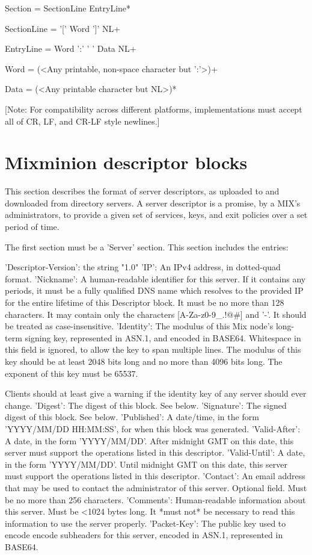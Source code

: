Section = SectionLine EntryLine*

SectionLine = '[' Word ']' NL+

EntryLine = Word ':' ' ' Data NL+

Word = (<Any printable, non-space character but ':'>)+

Data = (<Any printable character but NL>)*

[Note: For compatibility across different platforms, implementations must
  accept all of CR, LF, and CR-LF style newlines.]

\section{Mixminion descriptor blocks}

This section describes the format of server descriptors, as uploaded
to and downloaded from directory servers.  A server descriptor is a
promise, by a MIX's administrators, to provide a given set of
services, keys, and exit policies over a set period of time.

The first section must be a 'Server' section.  This section includes
the entries:

     'Descriptor-Version':  the string "1.0"
     'IP': An IPv4 address, in dotted-quad format.
     'Nickname': A human-readable identifier for this server.  If it
         contains any periods, it must be a fully qualified DNS name
         which resolves to the provided IP for the entire lifetime of
         this Descriptor block.  It must be no more than 128
         characters.  It may contain only the characters 
         [A-Za-z0-9_.!@#] and '-'.  It should be treated as
         case-insensitive.
     'Identity': The modulus of this Mix node's long-term signing key,
         represented in ASN.1, and encoded in BASE64.  Whitespace in
         this field is ignored, to allow the key to span multiple
         lines.  The modulus of this key should be at least 2048 bits
         long and no more than 4096 bits long.  The exponent of this 
         key must be 65537.

	 Clients should at least give a warning if the identity key of
         any server should ever change.
     'Digest': The digest of this block. See below.
     'Signature': The signed digest of this block.  See below.
     'Published': A date/time, in the form 'YYYY/MM/DD HH:MM:SS',
         for when this block was generated.
     'Valid-After': A date, in the form 'YYYY/MM/DD'.  After midnight GMT
         on this date, this server must support the operations listed
         in this descriptor.
     'Valid-Until': A date, in the form 'YYYY/MM/DD'.  Until midnight
         GMT on this date, this server must support the operations listed
         in this descriptor.
     'Contact': An email address that may be used to contact the
         administrator of this server. Optional field.  Must be no
         more than 256 characters.
     'Comments': Human-readable information about this server.  Must
         be <1024 bytes long.  It *must not* be necessary to read this
         information to use the server properly.
     'Packet-Key': The public key used to encode encode subheaders for
         this server, encoded in ASN.1, represented in BASE64. 

